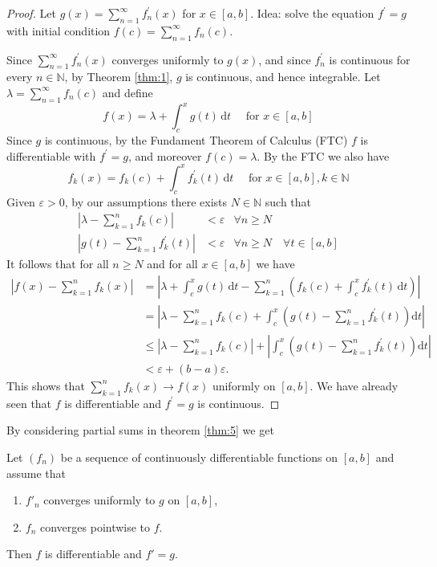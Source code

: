 \documentclass[a4paper,11pt]{article}
\begin{document}
\begin{proof}
    Let $g(x)=\sum_{n=1}^{\infty} f_{n}^{\prime}(x)$ for $x \in[a, b]$. Idea: solve the equation $f^{\prime}=g$ with initial condition $f(c)=\sum_{n=1}^{\infty} f_{n}(c)$.

    Since $\sum_{n=1}^{\infty} f_{n}^{\prime}(x)$ converges uniformly to $g(x)$, and since $f_{n}^{\prime}$ is continuous for every $n \in \mathbb{N}$, by Theorem \ref{thm:1}, $ g$ is continuous, and hence integrable. Let $\lambda=\sum_{n=1}^{\infty} f_{n}(c)$ and define
    \[
    f(x)=\lambda+\int_{c}^{x} g(t)\, \mathrm{d} t \quad \text { for } x \in[a, b]
    \]
    Since $g$ is continuous, by the Fundament Theorem of Calculus (FTC) $f$ is differentiable with $f^{\prime}=g$, and moreover $f(c)=\lambda$. By the FTC we also have
    \[
    f_{k}(x)=f_{k}(c)+\int_{c}^{x} f_{k}^{\prime}(t)\, \mathrm{d} t \quad \text { for } x \in[a, b], k \in \mathbb{N}
    \]
    Given $\varepsilon>0$, by our assumptions there exists $N \in \mathbb{N}$ such that
    \[
    \begin{array}{rll}
    \displaystyle \left|\lambda-\sum_{k=1}^{n} f_{k}(c)\right| & <\varepsilon & \forall n \geqslant N \\[15pt]
    \displaystyle \left|g(t)-\sum_{k=1}^{n} f_{k}^{\prime}(t)\right| & <\varepsilon & \forall n \geqslant N \quad \forall t \in[a, b]
    \end{array}
    \]
    It follows that for all $n \geqslant N$ and for all $x \in[a, b]$ we have
    \[
    \begin{aligned}
    \left|f(x)-\sum_{k=1}^{n} f_{k}(x)\right| &=\left|\lambda+\int_{c}^{x} g(t)\, \mathrm{d} t-\sum_{k=1}^{n}\left(f_{k}(c)+\int_{c}^{x} f_{k}^{\prime}(t) \,\mathrm{d} t\right)\right| \\
    &=\left|\lambda-\sum_{k=1}^{n} f_{k}(c)+\int_{c}^{x}\left(g(t)-\sum_{k=1}^{n} f_{k}^{\prime}(t)\right) \mathrm{d} t\right| \\
    & \leqslant\left|\lambda-\sum_{k=1}^{n} f_{k}(c)\right|+\left|\int_{c}^{x}\left(g(t)-\sum_{k=1}^{n} f_{k}^{\prime}(t)\right) \mathrm{d} t\right| \\
    &<\varepsilon+(b-a) \varepsilon.
    \end{aligned}
    \]
    This shows that $\sum_{k=1}^{n} f_{k}(x) \rightarrow f(x)$ uniformly on $[a, b]$. We have already seen that $f$ is differentiable and $f^{\prime}=g$ is continuous.
\end{proof}

By considering partial sums in theorem \ref{thm:5} we get 
\begin{theorem}
    Let $(f_n)$ be a sequence of continuously differentiable functions on $[a,b]$ and assume that 
    \begin{enumerate}
        \item $f'_n$ converges uniformly to $g$ on $[a,b]$, 
        \item $f_n$ converges pointwise to $f$.
    \end{enumerate}
    Then $f$ is differentiable and $ f'=g $. 
\end{theorem}
\end{document}
